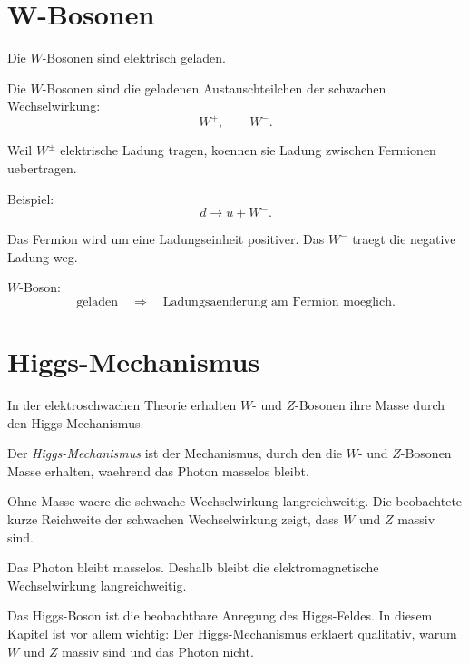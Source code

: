 \section{W-Bosonen}

Die $W$-Bosonen sind elektrisch geladen.

\begin{definitionbox}
Die $W$-Bosonen sind die geladenen Austauschteilchen der schwachen Wechselwirkung:
\[
    W^+,
    \qquad
    W^-.
\]
\end{definitionbox}

\begin{conceptbox}
Weil $W^\pm$ elektrische Ladung tragen, koennen sie Ladung zwischen Fermionen
uebertragen.

Beispiel:
\[
    d \rightarrow u+W^-.
\]

Das Fermion wird um eine Ladungseinheit positiver.
Das $W^-$ traegt die negative Ladung weg.
\end{conceptbox}

\begin{examtipbox}
$W$-Boson:
\[
    \text{geladen}
    \quad\Rightarrow\quad
    \text{Ladungsaenderung am Fermion moeglich}.
\]
\end{examtipbox}

\section{Higgs-Mechanismus}

In der elektroschwachen Theorie erhalten $W$- und $Z$-Bosonen ihre Masse durch den
Higgs-Mechanismus.

\begin{definitionbox}
Der \emph{Higgs-Mechanismus} ist der Mechanismus, durch den die $W$- und $Z$-Bosonen
Masse erhalten, waehrend das Photon masselos bleibt.
\end{definitionbox}

\begin{conceptbox}
Ohne Masse waere die schwache Wechselwirkung langreichweitig.
Die beobachtete kurze Reichweite der schwachen Wechselwirkung zeigt, dass $W$ und
$Z$ massiv sind.

Das Photon bleibt masselos.
Deshalb bleibt die elektromagnetische Wechselwirkung langreichweitig.
\end{conceptbox}

\begin{notebox}
Das Higgs-Boson ist die beobachtbare Anregung des Higgs-Feldes.
In diesem Kapitel ist vor allem wichtig:
Der Higgs-Mechanismus erklaert qualitativ, warum $W$ und $Z$ massiv sind und das
Photon nicht.
\end{notebox}

